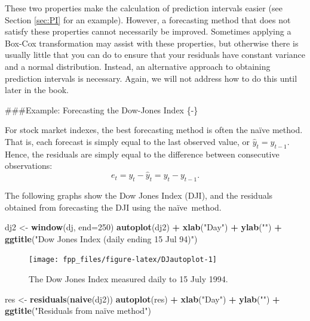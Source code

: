 \documentclass[]{book}
\newenvironment{Shaded}{\begin{snugshade}}{\end{snugshade}}
\newcommand{\DataTypeTok}[1]{\textcolor[rgb]{0.13,0.29,0.53}{#1}}
\newcommand{\DecValTok}[1]{\textcolor[rgb]{0.00,0.00,0.81}{#1}}
\newcommand{\KeywordTok}[1]{\textcolor[rgb]{0.13,0.29,0.53}{\textbf{#1}}}
\newcommand{\NormalTok}[1]{#1}
\newcommand{\OperatorTok}[1]{\textcolor[rgb]{0.81,0.36,0.00}{\textbf{#1}}}
\newcommand{\StringTok}[1]{\textcolor[rgb]{0.31,0.60,0.02}{#1}}
\begin{document}
These two properties make the calculation of prediction intervals easier (see Section \ref{sec:PI} for an example). However, a forecasting method that does not satisfy these properties cannot necessarily be improved. Sometimes applying a Box-Cox transformation may assist with these properties, but otherwise there is usually little that you can do to ensure that your residuals have constant variance and a normal distribution. Instead, an alternative approach to obtaining prediction intervals is necessary. Again, we will not address how to do this until later in the book.

\#\#\#Example: Forecasting the Dow-Jones Index \{-\}

For stock market indexes, the best forecasting method is often the naïve method. That is, each forecast is simply equal to the last observed value, or \(\hat{y}_{t} = y_{t-1}\). Hence, the residuals are simply equal to the difference between consecutive observations:
\[
  e_{t} = y_{t} - \hat{y}_{t} = y_{t} - y_{t-1}.
\]

The following graphs show the Dow Jones Index (DJI), and the residuals obtained from forecasting the DJI using the naïve~method.

\begin{Shaded}
\begin{Highlighting}[]
\NormalTok{dj2 <-}\StringTok{ }\KeywordTok{window}\NormalTok{(dj, }\DataTypeTok{end=}\DecValTok{250}\NormalTok{)}
\KeywordTok{autoplot}\NormalTok{(dj2) }\OperatorTok{+}\StringTok{ }\KeywordTok{xlab}\NormalTok{(}\StringTok{"Day"}\NormalTok{) }\OperatorTok{+}\StringTok{ }\KeywordTok{ylab}\NormalTok{(}\StringTok{""}\NormalTok{) }\OperatorTok{+}
\StringTok{  }\KeywordTok{ggtitle}\NormalTok{(}\StringTok{"Dow Jones Index (daily ending 15 Jul 94)"}\NormalTok{)}
\end{Highlighting}
\end{Shaded}

\begin{figure}

{\centering \texttt{[image: fpp\_files/figure-latex/DJautoplot-1]} 

}

\caption{The Dow Jones Index measured daily to 15 July 1994.}\label{fig:DJautoplot}
\end{figure}

\begin{Shaded}
\begin{Highlighting}[]
\NormalTok{res <-}\StringTok{ }\KeywordTok{residuals}\NormalTok{(}\KeywordTok{naive}\NormalTok{(dj2))}
\KeywordTok{autoplot}\NormalTok{(res) }\OperatorTok{+}\StringTok{ }\KeywordTok{xlab}\NormalTok{(}\StringTok{"Day"}\NormalTok{) }\OperatorTok{+}\StringTok{ }\KeywordTok{ylab}\NormalTok{(}\StringTok{""}\NormalTok{) }\OperatorTok{+}
\StringTok{  }\KeywordTok{ggtitle}\NormalTok{(}\StringTok{"Residuals from naïve method"}\NormalTok{)}
\end{Highlighting}
\end{Shaded}
\end{document}
